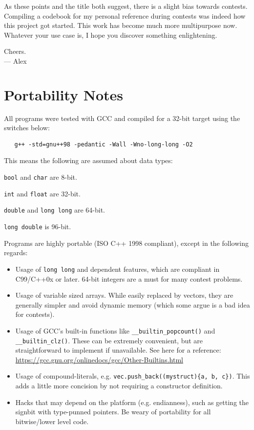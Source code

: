 \documentclass[10pt,letterpaper,twoside]{book}
\begin{document}
As these points and the title both suggest, there is a slight bias towards contests. Compiling a codebook for my personal reference during contests was indeed how this project got started. This work has become much more multipurpose now. Whatever your use case is, I hope you discover something enlightening.

\begin{flushright}
Cheers.\\
--- Alex
\end{flushright}

\section*{Portability Notes}

All programs were tested with GCC and compiled for a 32-bit target using the switches below:

\begin{verbatim}
   g++ -std=gnu++98 -pedantic -Wall -Wno-long-long -O2
\end{verbatim}

This means the following are assumed about data types:

\begin{compactitem}
	\item \texttt{bool} and \texttt{char} are 8-bit.
	\item \texttt{int} and \texttt{float} are 32-bit.
	\item \texttt{double} and \texttt{long long} are 64-bit.
	\item \texttt{long double} is 96-bit.
\end{compactitem}
\vspace{5pt}

Programs are highly portable (ISO C++ 1998 compliant), except in the following regards:

\begin{itemize}
	\item Usage of \texttt{long long} and dependent features, which are compliant in C99/C++0x or later. 64-bit integers are a must for many contest problems.
	\item Usage of variable sized arrays. While easily replaced by vectors, they are generally simpler and avoid dynamic memory (which some argue is a bad idea for contests).
	\item Usage of GCC's built-in functions like \texttt{\_\_builtin\_popcount()} and \texttt{\_\_builtin\_clz()}. These can be extremely convenient, but are straightforward to implement if unavailable. See here for a reference: \url{https://gcc.gnu.org/onlinedocs/gcc/Other-Builtins.html}
	\item Usage of compound-literals, e.g. \texttt{vec.push\_back((mystruct)\{a, b, c\})}. This adds a little more concision by not requiring a constructor definition.
	\item Hacks that may depend on the platform (e.g. endianness), such as getting the signbit with type-punned pointers. Be weary of portability for all bitwise/lower level code.
\end{itemize}

\tableofcontents

\mainmatter







\backmatter

\printindex
\end{document}
